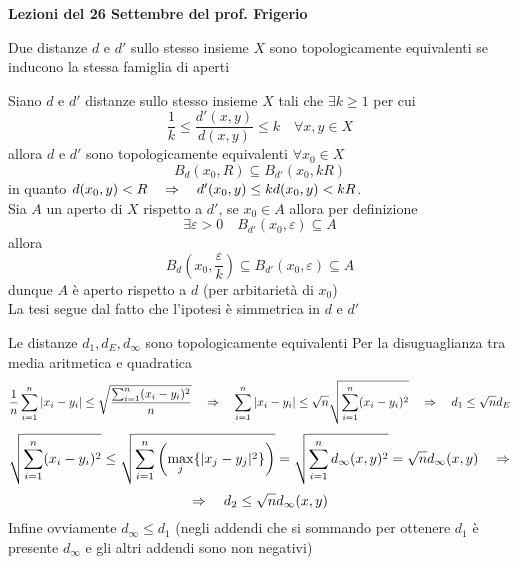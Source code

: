  

\textbf{Lezioni del 26  Settembre del prof. Frigerio}

\begin{defn}\bianco
Due distanze $d$ e $d'$ sullo stesso insieme $X$ sono topologicamente equivalenti se inducono la stessa famiglia di aperti
\end{defn}

\begin{lem} Siano $d$ e $d'$ distanze sullo stesso insieme $X$ tali che $\exists k\geq 1$ per cui
$$ \frac{1}{k} \leq \frac{d'(x,y)}{d(x,y)} \leq k \quad \forall x,y \in X$$ 
allora $d$ e $d'$ sono topologicamente equivalenti
\proof $\forall x_0 \in X$ $$B_d(x_0,R) \subseteq B_{d'}(x_0, kR)$$ 
in quanto $ d(x_0, y)< R \quad \Rightarrow \quad d'(x_0, y) \leq k d(x_0,y) < k R$.\\
Sia $A$ un aperto di $X$ rispetto a $d'$, se $x_0 \in A $ allora per definizione
$$ \exists \varepsilon>0 \quad B_{d'}(x_0, \varepsilon)\subseteq A$$
allora 
$$ B_d \left( x_0, \frac{\varepsilon}{k}\right) \subseteq B_{d'}(x_0, \varepsilon)\subseteq A $$
dunque $A$ \`e aperto rispetto a $d$ (per arbitariet\`a di $x_0$)\\
La tesi segue dal fatto che l'ipotesi \`e simmetrica in $d$ e $d'$
\end{lem}

\begin{cor}
 Le distanze $d_1, d_E, d_\infty $ sono topologicamente equivalenti
 \proof Per la disuguaglianza tra media aritmetica e quadratica 
 $$ \frac{1}{n} \sum_{i=1}^n \vert x_i - y_i \vert \leq \sqrt{ \frac{\sum_{i=1}^n (x_i-y_i)^2}{n}}
 \quad \Rightarrow \quad \sum_{i=1}^n \vert x_i - y_i \vert \leq \sqrt{n} \sqrt{\sum_{i=1}^n (x_i-y_i)^2} \quad \Rightarrow \quad d_1 \leq \sqrt{n} d_E$$
$$ \sqrt{\sum_{i=1}^n (x_i-y_i)^2 } \leq \sqrt{\sum_{i=1}^n \left( \max_j \{ \vert x_j-y_j\vert ^2 \} \right) } =\sqrt{\sum_{i=1}^n d_\infty (x,y)^2}= \sqrt{n}d_\infty(x,y) \quad \Rightarrow $$
$$\Rightarrow \quad d_2 \leq \sqrt{n} d_\infty(x,y)$$
Infine ovviamente $d_\infty \leq d_1$ (negli addendi che si sommando per ottenere $d_1$ \`e presente $d_\infty$ e gli altri addendi sono non negativi)

\end{cor}
\newpage	
